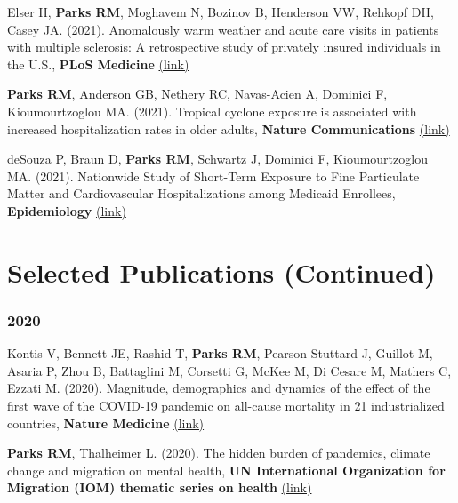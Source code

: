 \noindent Elser H, \textbf{Parks RM}, Moghavem N, Bozinov B, Henderson VW, Rehkopf DH, Casey JA. (2021). Anomalously warm weather and acute care visits in patients with multiple sclerosis: A retrospective study of privately insured individuals in the U.S., \textbf{PLoS Medicine} \href{https://journals.plos.org/plosmedicine/article?id=10.1371/journal.pmed.1003580}{(link)} \bigskip

\noindent \textbf{Parks RM}, Anderson GB, Nethery RC, Navas-Acien A, Dominici F, Kioumourtzoglou MA. (2021). Tropical cyclone exposure is associated with increased hospitalization rates in older adults, \textbf{Nature Communications} \href{https://www.nature.com/articles/s41467-021-21777-1}{(link)} \bigskip

\noindent deSouza P, Braun D, \textbf{Parks RM}, Schwartz J, Dominici F, Kioumourtzoglou MA. (2021). Nationwide Study of Short-Term Exposure to Fine Particulate Matter and Cardiovascular Hospitalizations among Medicaid Enrollees, \textbf{Epidemiology} \href{https://journals.lww.com/epidem/Abstract/2021/01000/Nationwide_Study_of_Short_term_Exposure_to_Fine.2.aspx}{(link)}

\newpage



\section*{Selected Publications (Continued)}

\subsubsection*{2020}

\noindent Kontis V, Bennett JE, Rashid T, \textbf{Parks RM}, Pearson-Stuttard J, Guillot M, Asaria P, Zhou B, Battaglini M, Corsetti G, McKee M, Di Cesare M, Mathers C, Ezzati M. (2020). Magnitude, demographics and dynamics of the effect of the first wave of the COVID-19 pandemic on all-cause mortality in 21 industrialized countries, \textbf{Nature Medicine} \href{https://doi.org/10.1038/s41591-020-1112-0}{(link)} \bigskip

\noindent \textbf{Parks RM}, Thalheimer L. (2020). The hidden burden of pandemics, climate change and migration on mental health, \textbf{UN International Organization for Migration (IOM) thematic series on health} \href{https://environmentalmigration.iom.int/blogs/hidden-burden-pandemics-climate-change-and-migration-mental-health}{(link)} \bigskip

